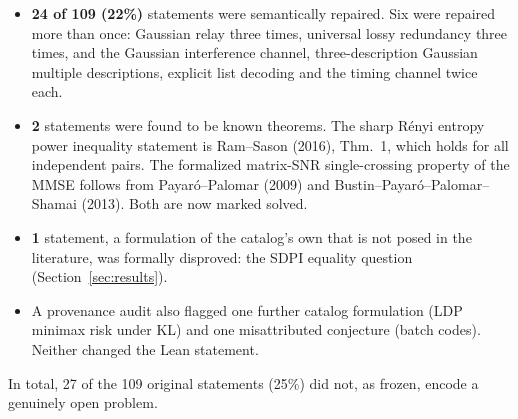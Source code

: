 \documentclass[11pt]{article}
\begin{document}
\begin{itemize}[leftmargin=*,itemsep=2pt]
\item \textbf{24 of 109 (22\%)} statements were semantically repaired. Six were repaired more
than once: Gaussian relay three times, universal lossy redundancy three times, and the Gaussian
interference channel, three-description Gaussian multiple descriptions, explicit list decoding and
the timing channel twice each.
\item \textbf{2} statements were found to be known theorems. The sharp R\'enyi entropy power
inequality statement is Ram--Sason (2016), Thm.~1, which holds for all independent pairs. The formalized matrix-SNR
single-crossing property of the MMSE follows from Payar\'o--Palomar (2009) and
Bustin--Payar\'o--Palomar--Shamai (2013). Both are now marked solved.
\item \textbf{1} statement, a formulation of the catalog's own that is not posed in the
literature, was formally disproved: the SDPI equality question (Section~\ref{sec:results}).
\item A provenance audit also flagged one further catalog formulation (LDP minimax risk under KL)
and one misattributed conjecture (batch codes). Neither changed the Lean statement.
\end{itemize}
In total, 27 of the 109 original statements (25\%) did not, as frozen, encode a genuinely open
problem.
\end{document}
